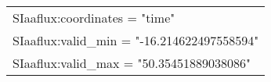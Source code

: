 \begin{longtable}{|p{\textwidth}|}
\hspace{0.5cm}\hspace{0.5cm}SIaaflux:coordinates = "time"\\
\hspace{0.5cm}\hspace{0.5cm}SIaaflux:valid\_min = "-16.214622497558594"\\
\hspace{0.5cm}\hspace{0.5cm}SIaaflux:valid\_max = "50.35451889038086"\\
\hline
\end{longtable}